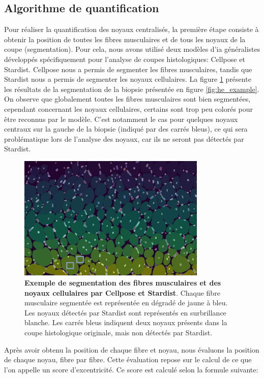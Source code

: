 \subsection{Algorithme de quantification}
Pour réaliser la quantification des noyaux centralisés, la première étape consiste à obtenir la position de toutes les fibres musculaires et de tous les noyaux de la coupe (segmentation). Pour cela, nous avons utilisé deux modèles d'\gls{ia} généralistes développés spécifiquement pour l'analyse de coupes histologiques: Cellpose et Stardist. Cellpose nous a permis de segmenter les fibres musculaires, tandis que Stardist nous a permis de segmenter les noyaux cellulaires. La figure \ref{fig:he_seg} présente les résultats de la segmentation de la biopsie présentée en figure \ref{fig:he_example}. On observe que globalement toutes les fibres musculaires sont bien segmentées, cependant concernant les noyaux cellulaires, certains sont trop peu colorés pour être reconnus par le modèle. C'est notamment le cas pour quelques noyaux centraux sur la gauche de la biopsie (indiqué par des carrés bleus), ce qui sera problématique lors de l'analyse des noyaux, car ils ne seront pas détectés par Stardist.
\begin{figure}[!ht]
 \centering
 \includegraphics[width=0.8\textwidth]{figures/he_seg.png}
 \caption[Exemple de segmentation de biopsie par Cellpose et Stardist]{\textbf{Exemple de segmentation des fibres musculaires et des noyaux cellulaires par Cellpose et Stardist}. Chaque fibre musculaire segmentée est représentée en dégradé de jaune à bleu. Les noyaux détectés par Stardist sont représentés en surbrillance blanche. Les carrés bleus indiquent deux noyaux présents dans la coupe histologique originale, mais non détectés par Stardist.}
 \label{fig:he_seg}
\end{figure}

Après avoir obtenu la position de chaque fibre et noyau, nous évaluons la position de chaque noyau, fibre par fibre. Cette évaluation repose sur le calcul de ce que l'on appelle un score d'excentricité. Ce score est calculé selon la formule suivante:


